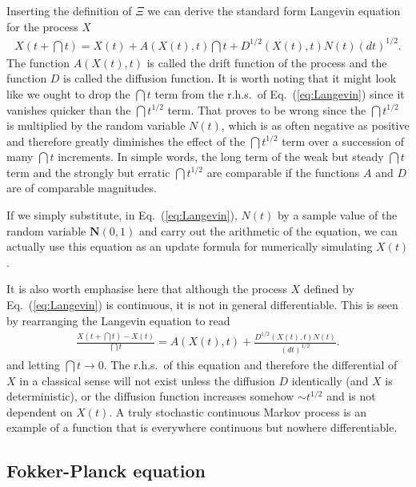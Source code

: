 \documentclass[10pt,a4paper]{article}
\newcommand{\eq}[1]{Eq.~(\ref{#1})}
\newcommand{\gaussian}{\ensuremath{\mathbf{N}}}
\begin{document}
Inserting the definition of $\Xi$ we can derive the standard form Langevin
equation for the process $X$
\begin{align}
X(t{+}\dint{t}) = X(t)+ A(X(t),t)\dint{t}+D^{1/2}(X(t),t)N(t)(dt)^{1/2}.
\label{eq:Langevin}
\end{align}
The function $A(X(t),t)$ is called the drift function of the process and the
function $D$ is called the diffusion function.
It is worth noting that it might look like we ought to drop the $\dint{t}$
term from the r.h.s.\ of \eq{eq:Langevin} since it vanishes  quicker than the
$\dint{t}^{1/2}$ term.  That proves to be wrong since the $\dint{t}^{1/2}$ is
multiplied by the random variable $N(t)$, which is as often negative as
positive and therefore greatly diminishes the effect of the $\dint{t}^{1/2}$
term over a succession of many $\dint{t}$ increments. In simple words, the
long term of the weak but steady $\dint{t}$ term and the strongly but erratic
$\dint{t}^{1/2}$ are comparable if the functions $A$ and $D$ are of
comparable magnitudes.

If we simply substitute, in \eq{eq:Langevin}, $N(t)$ by a sample value of
the random variable $\gaussian(0,1)$ and carry out the arithmetic of the
equation, we can actually use this equation as an update formula for
numerically simulating $X(t)$.

It is also worth emphasise here that although the process $X$ defined by
\eq{eq:Langevin} is continuous, it is not in general differentiable. This is
seen by rearranging the Langevin equation to read
\begin{align}
\frac{X(t{+}\dint{t}){-}X(t)}{\dint{t}} =  A(X(t),t)+
\frac{D^{1/2}(X(t),t)N(t)}{(dt)^{1/2}}.
\end{align}
and letting $\dint{t}\rightarrow0$. The r.h.s.\ of this equation and therefore
the differential of $X$ in a classical sense will not exist unless the
diffusion $D$ identically (and $X$ is deterministic), or the diffusion
function increases somehow $\sim t^{1/2}$ and is not dependent on
$X(t)$.  A truly stochastic continuous Markov process is an example of a function
that is everywhere continuous but nowhere differentiable.

\subsection{Fokker-Planck equation}
\end{document}

